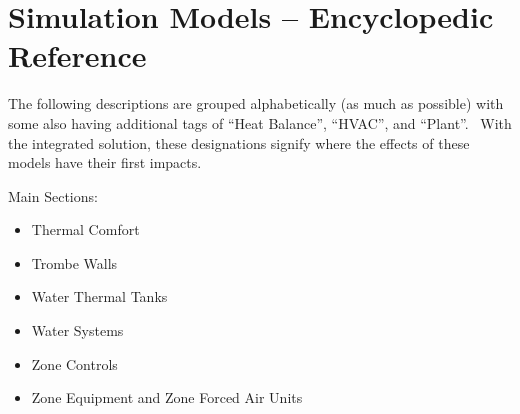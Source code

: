 \chapter{Simulation Models -- Encyclopedic Reference}\label{simulation-models---encyclopedic-reference-005}

The following descriptions are grouped alphabetically (as much as possible) with some also having additional tags of ``Heat Balance'', ``HVAC'', and ``Plant''.~ With the integrated solution, these designations signify where the effects of these models have their first impacts.

Main Sections:

\begin{itemize}
  \tightlist
  \item Thermal Comfort
  \item Trombe Walls
  \item Water Thermal Tanks
  \item Water Systems
  \item Zone Controls
  \item Zone Equipment and Zone Forced Air Units 
\end{itemize}
